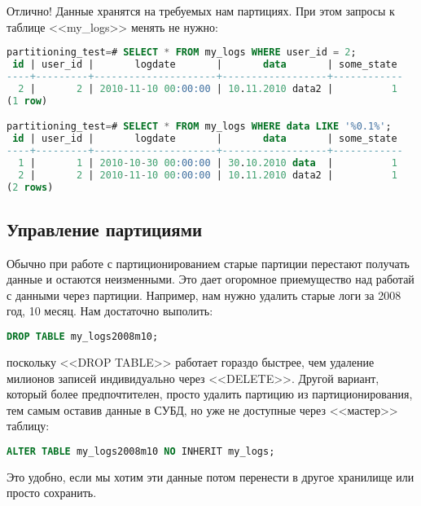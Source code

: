 Отлично! Данные хранятся на требуемых нам партициях. При этом запросы к таблице <<my\_logs>> менять не нужно:
\begin{lstlisting}[language=SQL,label=lst:partitioning11,caption=Проверка запросов]
partitioning_test=# SELECT * FROM my_logs WHERE user_id = 2;
 id | user_id |       logdate       |       data       | some_state 
----+---------+---------------------+------------------+------------
  2 |       2 | 2010-11-10 00:00:00 | 10.11.2010 data2 |          1
(1 row)

partitioning_test=# SELECT * FROM my_logs WHERE data LIKE '%0.1%';
 id | user_id |       logdate       |       data       | some_state 
----+---------+---------------------+------------------+------------
  1 |       1 | 2010-10-30 00:00:00 | 30.10.2010 data  |          1
  2 |       2 | 2010-11-10 00:00:00 | 10.11.2010 data2 |          1
(2 rows)
\end{lstlisting}

\subsection{Управление партициями}
Обычно при работе с партиционированием старые партиции перестают получать данные и остаются неизменными. 
Это дает огоромное приемущество над работай с данными через партиции. 
Например, нам нужно удалить старые логи за 2008 год, 10 месяц. Нам достаточно выполить:
\begin{lstlisting}[language=SQL,label=lst:partitioning12,caption=Чистка логов]
DROP TABLE my_logs2008m10;
\end{lstlisting}
поскольку <<DROP TABLE>> работает гораздо быстрее, чем удаление милионов записей индивидуально через <<DELETE>>.
Другой вариант, который более предпочтителен, просто удалить партицию из партиционирования, 
тем самым оставив данные в СУБД, но уже не доступные через <<мастер>> таблицу: 
\begin{lstlisting}[language=SQL,label=lst:partitioning13,caption=Удаляем партицию из партиционирования]
ALTER TABLE my_logs2008m10 NO INHERIT my_logs; 
\end{lstlisting}
Это удобно, если мы хотим эти данные потом перенести в другое хранилище или просто сохранить.

